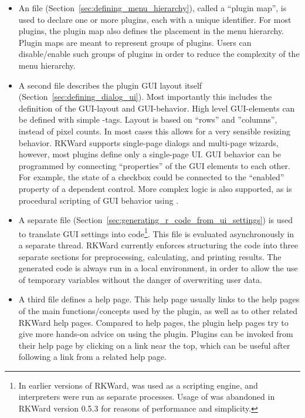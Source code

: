 \begin{itemize}
    \item
    An  file (Section~\ref{sec:defining_menu_hierarchy}), 
    called a ``plugin map'', is used to declare one or more plugins, each
    with a unique identifier. For most plugins, the plugin map also defines the
    placement in the menu hierarchy. Plugin maps are meant to represent groups of
    plugins. Users can disable/enable such groups of plugins in order to reduce the
    complexity of the menu hierarchy.

    \item
    A second  file describes the plugin GUI layout itself (Section~\ref{sec:defining_dialog_ui}). 
    Most importantly this includes
    the definition of the GUI-layout and GUI-behavior. High level GUI-elements can
    be defined with simple -tags. Layout is based on ``rows'' and ''columns'',
    instead of pixel counts. In most cases this allows for a very sensible resizing
    behavior. RKWard supports single-page dialogs and multi-page wizards, however,
    most plugins define only a single-page UI. GUI behavior can be programmed by
    connecting ``properties'' of the GUI elements to each other. For example, the state
    of a checkbox could be connected to the ``enabled'' property of a dependent
    control. More complex logic is also supported, as is procedural scripting of GUI
    behavior using .

    \item
    A separate  file (Section~\ref{sec:generating_r_code_from_ui_settings}) 
    is used to translate GUI settings into 
    code\footnote{
        In earlier versions of RKWard,  was used
        as a scripting engine, and  interpreters were run as separate processes.
        Usage of  was abandoned in RKWard version 0.5.3 for reasons of performance and simplicity.
    }. This  file is evaluated asynchronously in a separate thread. RKWard
    currently enforces structuring the code into three separate sections for
    preprocessing, calculating, and printing results. The generated code is always
    run in a local environment, in order to allow the use of temporary variables
    without the danger of overwriting user data.

    \item
    A third  file defines a help page. This help page usually links to the  help
    pages of the main functions/concepts used by the plugin, as well as to other 
    related RKWard help pages. Compared to  help
    pages, the plugin help pages try to give more hands-on advice on using the
    plugin. Plugins can be invoked from their help page by clicking on a link near
    the top, which can be useful after following a link from a related help page.
\end{itemize}

